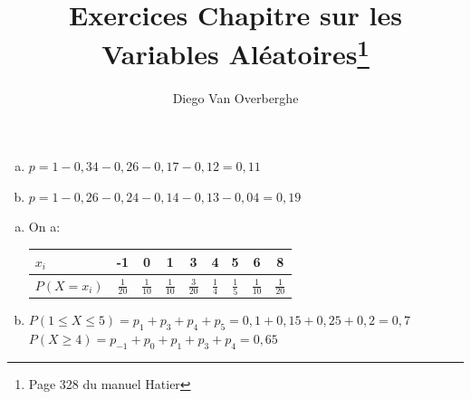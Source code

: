 \documentclass[12pt, a4paper]{article}
\begin{document}
    \title{Exercices Chapitre sur les Variables Aléatoires\footnote{Page 328 du manuel Hatier}}
    \author{Diego Van Overberghe}
    \maketitle
    
    \begin{Exercise}[number={33}]
        \begin{enumerate}[a)]
          \item $p=1-0{,}34-0{,}26-0{,}17-0{,}12=0{,}11$
          \item $p=1-0{,}26-0{,}24-0{,}14-0{,}13-0{,}04=0{,}19$
        \end{enumerate}
    \end{Exercise}

    \begin{Exercise}[number={35}]
      \begin{enumerate}[a)]
        \item On a: 
              \begin{center}\begin{tabular}{ | l || *{8}{c|} }
                \hline
                $x_i$                     & -1             & 0              & 1              & 3              & 4             & 5             & 6              & 8              \\ \hline
                $P(X=x_i)$ \hspace{0.5cm} & $\frac{1}{20}$ & $\frac{1}{10}$ & $\frac{1}{10}$ & $\frac{3}{20}$ & $\frac{1}{4}$ & $\frac{1}{5}$ & $\frac{1}{10}$ & $\frac{1}{20}$ \\ \hline
               \end{tabular}\end{center}
               \parbox{\linewidth}{}
               
        \item $P(1\leq X\leq 5)=p_1+p_3+p_4+p_5=0{,}1+0{,}15+0{,}25+0{,}2=0{,}7$ \\ $P(X\geq 4)=p_{-1}+p_0+p_1+p_3+p_4=0{,}65$
      \end{enumerate}
    \end{Exercise}
\end{document}
